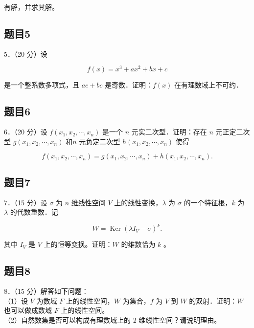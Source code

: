 \documentclass{article}
\begin{document}
有解，并求其解。

\subsection{题目5}
5．（20 分）设

\[
f(x)=x^{3}+a x^{2}+b x+c
\]

是一个整系数多项式，且 \(a c+b c\) 是奇数．证明：\(f(x)\) 在有理数域上不可约．

\subsection{题目6}
6．（20 分）设 \(f\left(x_{1}, x_{2}, \cdots, x_{n}\right)\) 是一个 \(n\) 元实二次型．证明：存在 \(n\) 元正定二次型 \(g\left(x_{1}, x_{2}, \cdots, x_{n}\right)\) 和\(n\) 元负定二次型 \(h\left(x_{1}, x_{2}, \cdots, x_{n}\right)\) 使得

\[
f\left(x_{1}, x_{2}, \cdots, x_{n}\right)=g\left(x_{1}, x_{2}, \cdots, x_{n}\right)+h\left(x_{1}, x_{2}, \cdots, x_{n}\right) .
\]

\subsection{题目7}
7．（15 分）设 \(\sigma\) 为 \(n\) 维线性空间 \(V\) 上的线性变换，\(\lambda\) 为 \(\sigma\) 的一个特征根，\(k\) 为 \(\lambda\) 的代数重数．记

\[
W=\operatorname{Ker}\left(\lambda I_{V}-\sigma\right)^{k} .
\]

其中 \(I_{V}\) 是 \(V\) 上的恒等变换。证明：\(W\) 的维数恰为 \(k\) 。

\subsection{题目8}
8．（15 分）解答如下问题：\\
（1）设 \(V\) 为数域 \(F\) 上的线性空间，\(W\) 为集合，\(f\) 为 \(V\) 到 \(W\) 的双射．证明：\(W\) 也可以做成数域 \(F\) 上的线性空间。\\
（2）自然数集是否可以构成有理数域上的 2 维线性空间？请说明理由。
\end{document}
